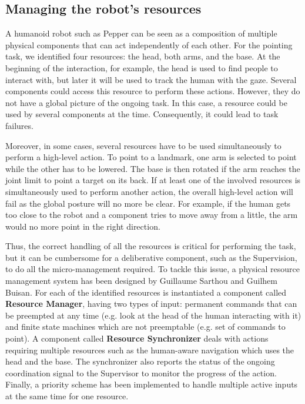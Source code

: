 \documentclass[a4paper,11pt,twoside]{StyleThese}
\begin{document}
\subsection{Managing the robot's resources}

A humanoid robot such as Pepper can be seen as a composition of multiple physical components that can act independently of each other. For the pointing task, we identified four resources: the head, both arms, and the base. At the beginning of the interaction, for example, the head is used to find people to interact with, but later it will be used to track the human with the gaze. Several components could access this resource to perform these actions. However, they do not have a global picture of the ongoing task. In this case, a resource could be used by several components at the time. Consequently, it could lead to task failures.

Moreover, in some cases, several resources have to be used simultaneously to perform a high-level action. To point to a landmark, one arm is selected to point while the other has to be lowered. The base is then rotated if the arm reaches the joint limit to point a target on its back. If at least one of the involved resources is simultaneously used to perform another action, the overall high-level action will fail as the global posture will no more be clear. For example, if the human gets too close to the robot and a component tries to move away from a little, the arm would no more point in the right direction.

Thus, the correct handling of all the resources is critical for performing the task, but it can be cumbersome for a deliberative component, such as the Supervision, to do all the micro-management required. To tackle this issue, a physical resource management system has been designed by Guillaume Sarthou and Guilhem Buisan. For each of the identified resources is instantiated a component called \textbf{Resource Manager}, having two types of input: permanent commands that can be preempted at any time (e.g. look at the head of the human interacting with it) and finite state machines which are not preemptable (e.g. set of commands to point). A component called \textbf{Resource Synchronizer} deals with actions requiring multiple resources such as the human-aware navigation which uses the head and the base. The synchronizer also reports the status of the ongoing coordination signal to the Supervisor to monitor the progress of the action. Finally, a priority scheme has been implemented to handle multiple active inputs at the same time for one resource. 
\end{document}
